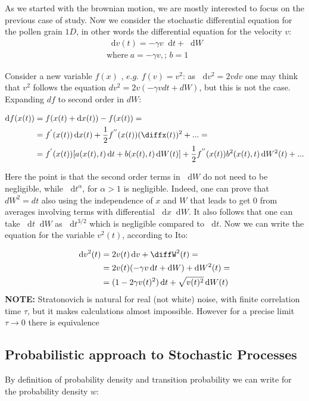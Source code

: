 \documentclass{article}
\newcommand*\diff{\mathop{}\!\mathrm{d}}
\begin{document}
As we started with the brownian motion, we are mostly interested to focus on the previous case of study. Now we consider the stochastic differential equation for the pollen grain $1 D$, in other words the differential equation for the velocity $v$:
\begin{align*}
\diff v(t) = -\gamma v \diff t + \diff W \\
\mathrm{where} \; a= -\gamma v, \textit{;  } b=1 
\end{align*}

Consider a new variable $f(x)$ , $\textit{e.g. } f(v)=v^2$: as $\diff v^2=2vdv$ one may think that $v^2$ follows the equation $dv^2=2v(-\gamma v dt + dW)$, but this is not the case.
Expanding $df$ to second order in $dW$:

\begin{align*}
\diff f(x(t)) & = f( x(t)+\diff x(t) ) - f( x(t) ) = \\
&= f^{'}( x(t) ) \diff x(t) + \frac{1}{2}f^{''}(x(t))(\diffx(t))^2+...  = \\
	   & = f^{'}( x(t) ) [ a(x(t),t)\diff t+b(x(t),t) \diff W(t) ] + \frac{1}{2}f^{''}(x(t))b^2(x(t),t)\diff W^2(t) + ... \\
\end{align*}

Here the point is that the second order terms in $\diff W$ do not need to be negligible, while $\diff t^\alpha$, for $\alpha > 1$ is negligible. Indeed, one can prove that $dW^2=dt$ also using the independence of $x$ and $W$ that leads to get 0 from averages involving terms with differential $\diff x\diff W$. It also follows that one can take $\diff t \diff W$ as $\diff t^{3/2}$ which is negligible compared to $\diff t$. Now we can write the equation for the variable $v^2(t)$, according to Ito:

\begin{align*}
\diff v^2(t) & = 2v(t)\diff v+\diffW^2(t) =  \\
	   & = 2v(t)(-\gamma v \diff t + \diff W)+\diff W^2(t) =\\
	   & = (1-2\gamma v(t)^2) \diff t + \sqrt{ v(t)^2}\diff W(t)
\end{align*}
\textbf{NOTE:} \newline
Stratonovich is natural for real (not white) noise, with finite correlation time $\tau$, but it makes calculations almost impossible. However for a precise limit $\tau \to 0$ there is equivalence
\newline
\subsection{Probabilistic approach to Stochastic Processes}
By definition of probability density and transition probability we can write for the probability density $w$:
\end{document}
